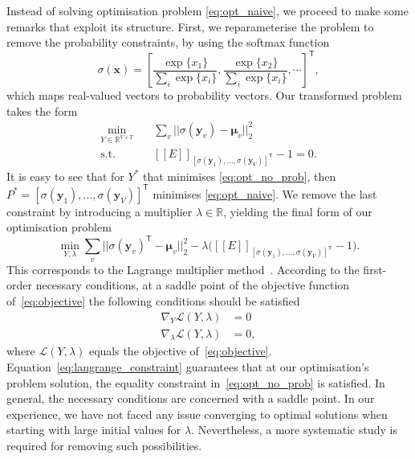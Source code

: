 \documentclass[acmsmall,nonacm]{acmart}\settopmatter{printfolios=true,printccs=false,printacmref=false}
\newcommand{\qqpi}[2]{[\![#2]\!]_{#1}}
\begin{document}
Instead of solving optimisation problem \eqref{eq:opt_naive}, we proceed to make some remarks that exploit its structure.
First, we reparameterise the problem to remove the probability constraints, by using the softmax function
\begin{equation}\label{eq:softmax}
	\sigma(\bm{x}) = \left[\frac{\exp\{x_1\}}{\sum_i \exp\{x_i\}}, \frac{\exp\{x_2\}}{\sum_i \exp\{x_i\}}, \cdots \right]^\mathsf{T},
\end{equation}
which maps real-valued vectors to probability vectors.
Our transformed problem takes the form
\begin{equation}
	\begin{aligned}\label{eq:opt_no_prob}
		\underset{Y \in \mathbb{R}^{V \times T}}{\mathrm{min}} & \quad
		\sum_v || \sigma(\bm{y}_v) - \bm{\mu}_v ||_2^2                                                                         \\
		\text{s.t. } & \quad
		\qqpi{[\sigma(\bm{y}_1), \ldots, \sigma(\bm{y}_{V})]^\mathsf{T}}{E} -1 = 0.
	\end{aligned}
\end{equation}
It is easy to see that for $Y^*$ that minimises \eqref{eq:opt_no_prob}, then
$P^* = [\sigma(\bm{y}_1), \ldots, \allowbreak \sigma(\bm{y}_{V})]^\mathsf{T}$
minimises \eqref{eq:opt_naive}.
% 
We remove the last constraint by introducing a multiplier $\lambda \in \mathbb{R}$, 
yielding the final form of our optimisation problem
\begin{equation}\label{eq:objective}
	\min_{Y, \lambda}
	\sum_v || \sigma(\bm{y}_v)^\mathsf{T} - \bm{\mu}_v ||_2^2
	- \lambda \big(\qqpi{[\sigma(\bm{y}_1), \ldots, \sigma(\bm{y}_{V})]^\mathsf{T}}{E} - 1\big).
\end{equation}
This corresponds to the Lagrange multiplier method~\citep{bertsekas82}.
According to the first-order necessary conditions, at a saddle point of the objective function of~\eqref{eq:objective} the following conditions should be satisfied
\begin{subequations}
\begin{align}
    \nabla_Y \mathcal{L}(Y, \lambda) & = 0\\
    \nabla_\lambda \mathcal{L}(Y, \lambda) & = 0,\label{eq:langrange_constraint}
\end{align}
\end{subequations}
where $\mathcal{L}(Y, \lambda)$ equals the objective of~\eqref{eq:objective}.
Equation~\eqref{eq:langrange_constraint} guarantees that at our optimisation's problem solution, the equality constraint in~\eqref{eq:opt_no_prob} is satisfied.
In general, the necessary conditions are concerned with a saddle point.
In our experience, we have not faced any issue converging to optimal solutions when starting with large initial values for $\lambda$.
Nevertheless, a more systematic study is required for removing such possibilities.
\end{document}
